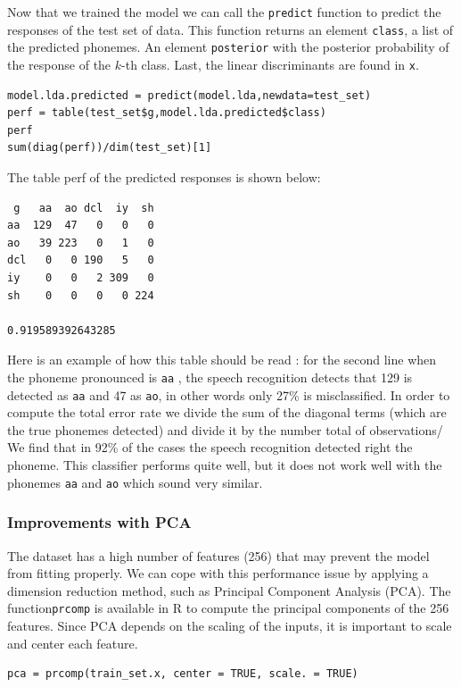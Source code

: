 \documentclass[]{report}
\begin{document}
Now that we trained the model we can call the \texttt{predict} function to predict the responses of the test set of data. This function returns an element \texttt{class}, a list of the predicted phonemes. An element \texttt{posterior} with the posterior probability of the response of the $k$-th class.  Last, the linear discriminants are found in \texttt{x}.

\begin{lstlisting}
model.lda.predicted = predict(model.lda,newdata=test_set)
perf = table(test_set$g,model.lda.predicted$class)
perf
sum(diag(perf))/dim(test_set)[1]
\end{lstlisting}

The table perf of the predicted responses is shown below:
\begin{center}
\begin{verbatim}
 g 	 aa  ao dcl  iy  sh
aa  129  47   0   0   0
ao   39 223   0   1   0
dcl   0   0 190   5   0
iy    0   0   2 309   0
sh    0   0   0   0 224

0.919589392643285
\end{verbatim}
\end{center}

Here is an example of how this table should be read : for the second line
when the phoneme pronounced is \texttt{aa} , the speech recognition detects that 129 is detected as \texttt{aa} and 47 as \texttt{ao}, in other words only 27\% is misclassified.
In order to compute the total error rate we divide the sum of the diagonal terms (which are the true phonemes detected) and divide it by the number total of observations/ We find that in 92\% of the cases the speech recognition detected right the phoneme. This classifier performs quite well, but it does not work well with the phonemes \texttt{aa} and \texttt{ao} which sound very similar.

\subsubsection{Improvements with PCA}
The dataset has a high number of features (256) that may prevent the model from fitting properly. We can cope with this performance issue by applying a dimension reduction method, such as Principal Component Analysis (PCA). The function\texttt{prcomp} is available in R to compute the principal components of the 256 features. Since PCA depends on the scaling of the inputs, it is important to scale and center each feature.
\begin{lstlisting}
pca = prcomp(train_set.x, center = TRUE, scale. = TRUE)
\end{lstlisting}
\end{document}
